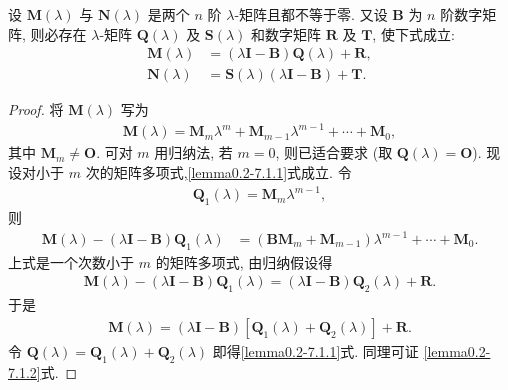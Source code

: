 \documentclass[../../main.tex]{subfiles}%
\begin{document}
\begin{lemma}\label{lemma:lambda-矩阵的性质1}
设 $\boldsymbol{M}(\lambda)$ 与 $\boldsymbol{N}(\lambda)$ 是两个 $n$ 阶 $\lambda$-矩阵且都不等于零. 又设 $\boldsymbol{B}$ 为 $n$ 阶数字矩阵, 则必存在 $\lambda$-矩阵 $\boldsymbol{Q}(\lambda)$ 及 $\boldsymbol{S}(\lambda)$ 和数字矩阵 $\boldsymbol{R}$ 及 $\boldsymbol{T}$, 使下式成立:
\begin{align}
\boldsymbol{M}(\lambda)&=(\lambda\boldsymbol{I}-\boldsymbol{B})\boldsymbol{Q}(\lambda)+\boldsymbol{R}, \label{lemma0.2-7.1.1}\\
\boldsymbol{N}(\lambda)&=\boldsymbol{S}(\lambda)(\lambda\boldsymbol{I}-\boldsymbol{B})+\boldsymbol{T}. \label{lemma0.2-7.1.2}
\end{align}
\end{lemma}
\begin{proof}

将 $\boldsymbol{M}(\lambda)$ 写为
\begin{align*}
\boldsymbol{M}(\lambda)=\boldsymbol{M}_m\lambda^m+\boldsymbol{M}_{m - 1}\lambda^{m - 1}+\cdots+\boldsymbol{M}_0,
\end{align*}
其中 $\boldsymbol{M}_m\neq\boldsymbol{O}$. 可对 $m$ 用归纳法, 若 $m = 0$, 则已适合要求 (取 $\boldsymbol{Q}(\lambda)=\boldsymbol{O}$). 现设对小于 $m$ 次的矩阵多项式,\eqref{lemma0.2-7.1.1}式成立. 令
\begin{align*}
\boldsymbol{Q}_1(\lambda)=\boldsymbol{M}_m\lambda^{m - 1},
\end{align*}
则
\begin{align}
\boldsymbol{M}(\lambda)-(\lambda\boldsymbol{I}-\boldsymbol{B})\boldsymbol{Q}_1(\lambda)&=(\boldsymbol{B}\boldsymbol{M}_m+\boldsymbol{M}_{m - 1})\lambda^{m - 1}+\cdots+\boldsymbol{M}_0. \label{lemma0.2-7.1.3}
\end{align}
上式是一个次数小于 $m$ 的矩阵多项式, 由归纳假设得
\begin{align*}
\boldsymbol{M}(\lambda)-(\lambda\boldsymbol{I}-\boldsymbol{B})\boldsymbol{Q}_1(\lambda)=(\lambda\boldsymbol{I}-\boldsymbol{B})\boldsymbol{Q}_2(\lambda)+\boldsymbol{R}.
\end{align*}
于是
\begin{align*}
\boldsymbol{M}(\lambda)=(\lambda\boldsymbol{I}-\boldsymbol{B})[\boldsymbol{Q}_1(\lambda)+\boldsymbol{Q}_2(\lambda)]+\boldsymbol{R}.
\end{align*}
令 $\boldsymbol{Q}(\lambda)=\boldsymbol{Q}_1(\lambda)+\boldsymbol{Q}_2(\lambda)$ 即得\eqref{lemma0.2-7.1.1}式. 同理可证 \eqref{lemma0.2-7.1.2}式. 

\end{proof}
\end{document}
